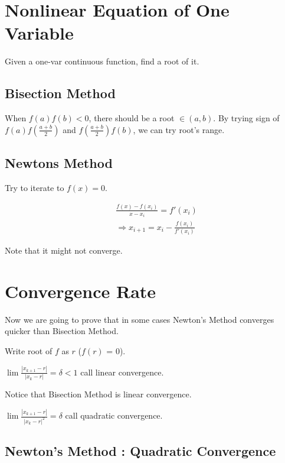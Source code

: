 \section{Nonlinear Equation of One Variable}

Given a one-var continuous function, find a root of it.

\subsection{Bisection Method}

When $f(a)f(b) < 0$, there should be a root $\in (a, b)$.
By trying sign of $f(a)f(\frac{a+b}{2})$ and $f(\frac{a+b}{2})f(b)$,
we can try root's range.

\subsection{Newtons Method}

Try to iterate to $f(x) = 0$.

\begin{align}
  &\frac{f(x) - f(x_i)}{x - x_i} = f'(x_i) \nonumber \\
  &\Rightarrow x_{i+1} = x_i - \frac{f(x_i)}{f'(x_i)} \nonumber
\end{align}

Note that it might not converge.

\section{Convergence Rate}

Now we are going to prove that in some cases
Newton's Method converges quicker than Bisection Method.

Write root of $f$ as $r$ ($f(r)$ = 0).

\begin{definition}
  $\lim \frac{|x_{k+1} - r|}{|x_k - r|} = \delta < 1$
  call linear convergence. 
\end{definition}

Notice that Bisection Method is linear convergence.

\begin{definition}
  $\lim \frac{|x_{k+1} - r|}{|x_k - r|^2} = \delta$
  call quadratic convergence. 
\end{definition}

\subsection{Newton's Method : Quadratic Convergence}

